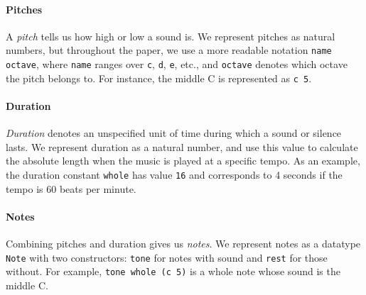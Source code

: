 \paragraph{Pitches}

A \emph{pitch} tells us how high or low a sound is.
We represent pitches as natural numbers, but throughout the paper,
we use a more readable notation \texttt{name octave}, where
\texttt{name} ranges over \texttt{c}, \texttt{d}, \texttt{e}, etc.,
and \texttt{octave} denotes which octave the pitch belongs to.
For instance, the middle C is represented as \texttt{c 5}.




\paragraph{Duration}

\emph{Duration} denotes an unspecified unit of time during which
a sound or silence lasts.
We represent duration as a natural number, and use this value to
calculate the absolute length when the music is played at a specific
tempo.
As an example, the duration constant \texttt{whole} has value
\texttt{16} and corresponds to 4 seconds if the tempo is 60 beats
per minute.


\paragraph{Notes}

Combining pitches and duration gives us \emph{notes}.
We represent notes as a datatype \texttt{Note} with two constructors:
\texttt{tone} for notes with sound and \texttt{rest} for those without.
For example, \texttt{tone whole (c 5)} is a whole note whose sound
is the middle C.


